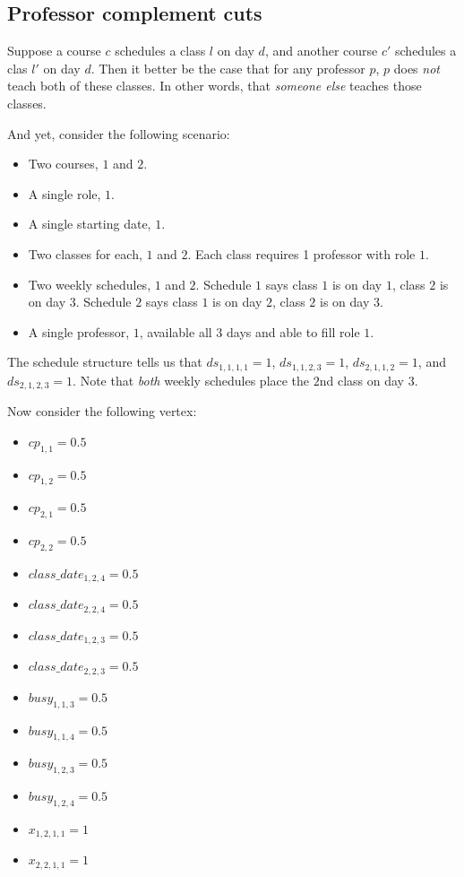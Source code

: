 \subsection{Professor complement cuts}

Suppose a course $c$ schedules a class $l$ on day $d$, and another course $c'$ schedules a clas $l'$ on day $d$. Then it better be the case that for any professor $p$, $p$ does \emph{not} teach both of these classes. In other words, that \emph{someone else} teaches those classes.

And yet, consider the following scenario:

\begin{itemize}
\item Two courses, $1$ and $2$.
\item A single role, $1$.
\item A single starting date, $1$.
\item Two classes for each, $1$ and $2$. Each class requires 1 professor with role $1$.
\item Two weekly schedules, $1$ and $2$. Schedule $1$ says class $1$ is on day $1$, class $2$ is on day $3$. Schedule $2$ says class $1$ is on day $2$, class $2$ is on day $3$.
\item A single professor, $1$, available all $3$ days and able to fill role $1$.
\end{itemize}

The schedule structure tells us that $ds_{1, 1, 1, 1} = 1$, $ds_{1, 1, 2, 3} = 1$, $ds_{2, 1, 1, 2} = 1$, and $ds_{2, 1, 2, 3} = 1$. Note that \emph{both} weekly schedules place the $2$nd class on day $3$.

Now consider the following vertex:

\begin{itemize}
\item $cp_{1, 1} = 0.5$
\item $cp_{1, 2} = 0.5$
\item $cp_{2, 1} = 0.5$
\item $cp_{2, 2} = 0.5$
\item $class\_date_{1, 2, 4} = 0.5$
\item $class\_date_{2, 2, 4} = 0.5$
\item $class\_date_{1, 2, 3} = 0.5$
\item $class\_date_{2, 2, 3} = 0.5$
\item $busy_{1, 1, 3} = 0.5$
\item $busy_{1, 1, 4} = 0.5$
\item $busy_{1, 2, 3} = 0.5$
\item $busy_{1, 2, 4} = 0.5$
\item $x_{1, 2, 1, 1} = 1$
\item $x_{2, 2, 1, 1} = 1$
\end{itemize}

